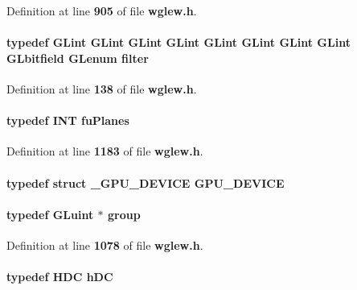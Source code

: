 Definition at line {\bf 905} of file {\bf wglew.\+h}.

\paragraph[{filter}]{\setlength{\rightskip}{0pt plus 5cm}typedef {\bf G\+Lint} {\bf G\+Lint} {\bf G\+Lint} {\bf G\+Lint} {\bf G\+Lint} {\bf G\+Lint} {\bf G\+Lint} {\bf G\+Lint} {\bf G\+Lbitfield} {\bf G\+Lenum} {\bf filter}}\label{wglew_8h_a6832b9d605f40ff6e8e8f56d0ed3c51b}


Definition at line {\bf 138} of file {\bf wglew.\+h}.

\paragraph[{fu\+Planes}]{\setlength{\rightskip}{0pt plus 5cm}typedef {\bf I\+NT} {\bf fu\+Planes}}\label{wglew_8h_acddb291d98ed011b2136289b0cb981c9}


Definition at line {\bf 1183} of file {\bf wglew.\+h}.

\paragraph[{G\+P\+U\+\_\+\+D\+E\+V\+I\+CE}]{\setlength{\rightskip}{0pt plus 5cm}typedef struct {\bf \+\_\+\+G\+P\+U\+\_\+\+D\+E\+V\+I\+CE}  {\bf G\+P\+U\+\_\+\+D\+E\+V\+I\+CE}}\label{wglew_8h_a0319df955afcbca7b016ff0f73ccc63c}
\paragraph[{group}]{\setlength{\rightskip}{0pt plus 5cm}typedef {\bf G\+Luint} $\ast$ {\bf group}}\label{wglew_8h_a69cec9b28d037f2272131b4fcd148620}


Definition at line {\bf 1078} of file {\bf wglew.\+h}.

\paragraph[{h\+DC}]{\setlength{\rightskip}{0pt plus 5cm}typedef {\bf H\+DC} {\bf h\+DC}}\label{wglew_8h_a3ad0eade1f425b718bd6461c1ef31af8}


